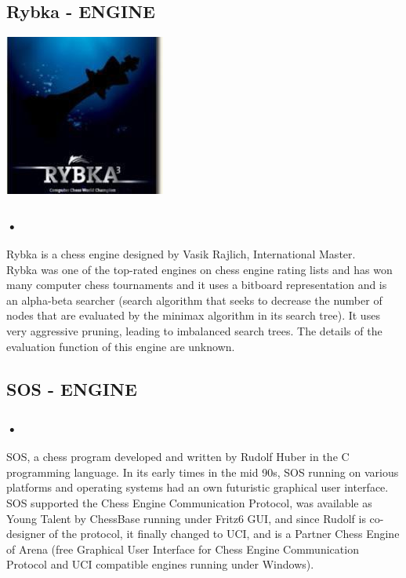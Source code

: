 \documentclass{svproc}
\begin{document}
\subsection{Rybka - ENGINE}

\begin{center}
  \includegraphics[scale=0.5]{rybka}
\end{center}

\subsubsection{•}
Rybka is a chess engine designed by Vasik Rajlich, International Master. \\ Rybka was one of the top-rated engines on chess engine rating lists and has won many computer chess tournaments and it uses a bitboard representation and is an alpha-beta searcher (search algorithm that seeks to decrease the number of nodes that are evaluated by the minimax algorithm in its search tree). It uses very aggressive pruning, leading to imbalanced search trees. The details of the evaluation function of this engine are unknown.


\subsection{SOS - ENGINE}

\subsubsection{•}
SOS, a chess program developed and written by Rudolf Huber in the C programming language. In its early times in the mid 90s, SOS running on various platforms and operating systems had an own futuristic graphical user interface. SOS supported the Chess Engine Communication Protocol, was available as Young Talent by ChessBase running under Fritz6 GUI, and since Rudolf is co-designer of the protocol, it finally changed to UCI, and is a Partner Chess Engine of Arena (free Graphical User Interface for Chess Engine Communication Protocol and UCI compatible engines running under Windows). 
\end{document}
